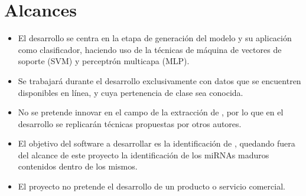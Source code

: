 %
%
%
\section{Alcances}
%
\begin{itemize}
\item
  El desarrollo se centra en la etapa de generación del modelo
  y su aplicación como clasificador, haciendo uso de la técnicas de
  máquina de vectores de soporte (SVM) y perceptrón multicapa
  (MLP).
\item
  Se trabajará durante el desarrollo exclusivamente con datos que se
  encuentren disponibles en línea, y cuya pertenencia de clase sea
  conocida.
\item
  No se pretende innovar en el campo de la extracción de ,
  por lo que en el desarrollo se replicarán técnicas propuestas
  por otros autores.
\item
  El objetivo del software a desarrollar es la identificación de
  , quedando fuera del alcance de este proyecto la
  identificación de los miRNAs maduros contenidos dentro de los 
  mismos.
\item
  El proyecto no pretende el desarrollo de un producto o servicio
  comercial.
\end{itemize}
%
